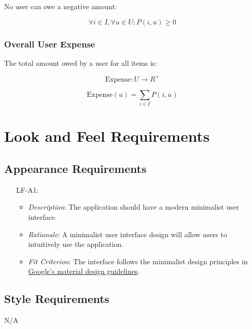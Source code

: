 \documentclass[12pt]{article}
\begin{document}
No user can owe a negative amount:

\[
\forall i \in I, \forall u \in U: P(i, u) \geq 0
\]

\subsubsection*{Overall User Expense}

The total amount owed by a user for all items is:

\[
\text{Expense}: U \rightarrow R^+
\]

\[
\text{Expense}(u) = \sum_{i \in I} P(i, u)
\]


\section{Look and Feel Requirements}
\subsection{Appearance Requirements}
\noindent \begin{itemize}
    \item[LF-A1:] 
    \begin{itemize}
        \item \textit{Description}: The application should have a modern minimalist user interface.
        \item \textit{Rationale}: A minimalist user interface design will allow users to intuitively use the application.
        \item \textit{Fit Criterion}: The interface follows the minimalist design principles in \href{https://m3.material.io/foundations}{Google's material design guidelines}. 
    \end{itemize}
\end{itemize}

\subsection{Style Requirements}

N/A

\end{document}
